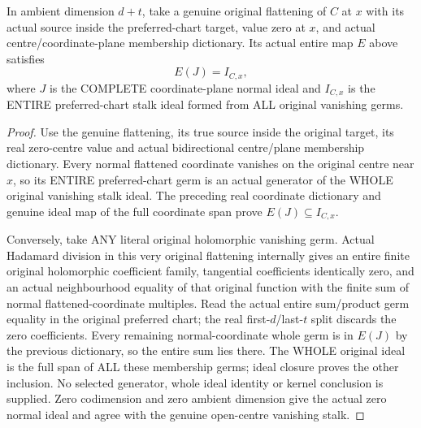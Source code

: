 \begin{theorem}
\label{hir:smooth-centre-entire-vanishing-stalk-normal-ideal}
\leanok
In ambient dimension $d+t$, take a genuine original flattening of $C$ at $x$
with its actual source inside the preferred-chart target, value zero at $x$,
and actual centre/coordinate-plane membership dictionary. Its actual entire
map $E$ above satisfies
\[
 E(J)=I_{C,x},
\]
where $J$ is the COMPLETE coordinate-plane normal ideal and $I_{C,x}$ is the
ENTIRE preferred-chart stalk ideal formed from ALL original vanishing germs.
\end{theorem}
\begin{proof}
Use the genuine flattening, its true source inside the original target, its
real zero-centre value and actual bidirectional centre/plane membership
dictionary. Every normal
flattened coordinate vanishes on the original centre near $x$, so its ENTIRE
preferred-chart germ is an actual generator of the WHOLE original vanishing
stalk ideal. The preceding real coordinate dictionary and genuine ideal map
of the full coordinate span prove $E(J)\subseteq I_{C,x}$.

Conversely, take ANY literal original holomorphic vanishing germ. Actual
Hadamard division in this very original flattening internally gives an entire
finite original holomorphic coefficient family, tangential coefficients
identically zero, and an actual neighbourhood equality of that original
function with the finite sum of normal flattened-coordinate multiples.
Read the actual entire sum/product germ equality in the original preferred
chart; the real first-$d$/last-$t$ split discards the zero coefficients.
Every remaining normal-coordinate whole germ is in $E(J)$ by the previous
dictionary, so the entire sum lies there. The WHOLE original ideal is the
full span of ALL these membership germs; ideal closure proves the other
inclusion. No selected generator, whole ideal identity or kernel conclusion
is supplied. Zero codimension and zero ambient dimension give the actual zero
normal ideal and agree with the genuine open-centre vanishing stalk.
\end{proof}

